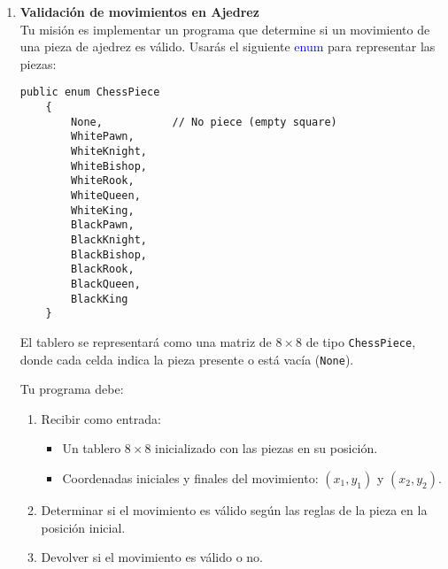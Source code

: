 \begin{enumerate}
    \item \textbf{Validación de movimientos en Ajedrez}\\
    Tu misión es implementar un programa que determine si un movimiento de una pieza de ajedrez es válido. Usarás el siguiente \textcolor{blue}{enum} para representar las piezas:

    \begin{lstlisting}[caption=Enumeración para las piezas de ajedrez]
    public enum ChessPiece
    {
        None,           // No piece (empty square)
        WhitePawn,
        WhiteKnight,
        WhiteBishop,
        WhiteRook,
        WhiteQueen,
        WhiteKing,
        BlackPawn,
        BlackKnight,
        BlackBishop,
        BlackRook,
        BlackQueen,
        BlackKing
    }
    \end{lstlisting}

    El tablero se representará como una matriz de \(8 \times 8\) de tipo \texttt{ChessPiece}, donde cada celda indica la pieza presente o está vacía (\texttt{None}).

    Tu programa debe:
    \begin{enumerate}
        \item Recibir como entrada:
        \begin{itemize}
            \item Un tablero \(8 \times 8\) inicializado con las piezas en su posición.
            \item Coordenadas iniciales y finales del movimiento: \((x_1, y_1)\) y \((x_2, y_2)\).
        \end{itemize}
        \item Determinar si el movimiento es válido según las reglas de la pieza en la posición inicial.
        \item Devolver si el movimiento es válido o no.
    \end{enumerate}


\end{enumerate}
